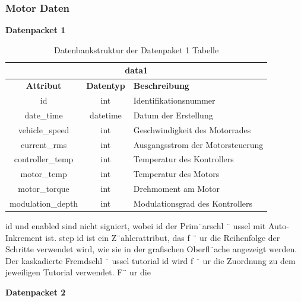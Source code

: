 \subsubsection{Motor Daten}

\textbf{Datenpacket 1}
 
\begin{table}[H]
	\begin{center}
		\begin{tabular}{|c|c|l|}
			\hline
			\multicolumn{3}{|c|}{\textbf{data1}} \\ \hline
			\textbf{Attribut} & \textbf{Datentyp} & \textbf{Beschreibung}            \\ \hline
			id                & int               & Identifikationsnummer            \\ \hline
			date\_time        & datetime          & Datum der Erstellung             \\ \hline
			vehicle\_speed    & int               & Geschwindigkeit des Motorrades   \\ \hline
			current\_rms      & int               & Ausgangsstrom der Motorsteuerung \\ \hline
			controller\_temp  & int               & Temperatur des Kontrollers       \\ \hline
			motor\_temp       & int               & Temperatur des Motors            \\ \hline
			motor\_torque     & int               & Drehmoment am Motor              \\ \hline
			modulation\_depth & int               & Modulationsgrad des Kontrollers  \\ \hline
		\end{tabular}
			\caption{Datenbankstruktur der Datenpaket 1 Tabelle}
			\label{tab:data1}
	\end{center}
\end{table}

id und enabled sind nicht signiert, wobei id der Prim¨arschl ¨ ussel mit Auto-Inkrement ist.
step id ist ein Z¨ahlerattribut, das f ¨ ur die Reihenfolge der Schritte verwendet wird, wie
sie in der grafischen Oberfl¨ache angezeigt werden. Der kaskadierte Fremdschl ¨ ussel
tutorial id wird f ¨ ur die Zuordnung zu dem jeweiligen Tutorial verwendet. F¨ ur die

\newpage

\textbf{Datenpacket 2}

